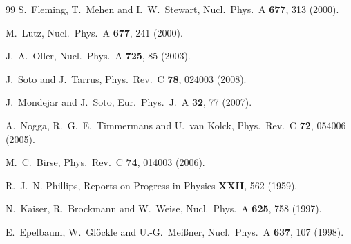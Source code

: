 \documentclass[aps,rmp,nofootinbib,twocolumn,floatfix]{revtex4}
\begin{document}
\begin{thebibliography}{99}
  S.~Fleming, T.~Mehen and I.~W.~Stewart,
  Nucl.\ Phys.\  A {\bf 677}, 313 (2000).

  M.~Lutz,
  Nucl.\ Phys.\  A {\bf 677}, 241 (2000).

  J.~A.~Oller,
  Nucl.\ Phys.\  A {\bf 725}, 85 (2003).

  J.~Soto and J.~Tarrus,
  Phys.\ Rev.\  C {\bf 78}, 024003 (2008).

  J.~Mondejar and J.~Soto,
  Eur.\ Phys.\ J.\  A {\bf 32}, 77 (2007).

  A.~Nogga, R.~G.~E.~Timmermans and U.~van Kolck,
  Phys.\ Rev.\  C {\bf 72}, 054006 (2005).

  M.~C.~Birse,
  Phys.\ Rev.\  C {\bf 74}, 014003 (2006).

R.~J.~N. Phillips,
\newblock Reports on Progress in Physics {\bf XXII}, 562 (1959).


  N.~Kaiser, R.~Brockmann and W.~Weise,
  Nucl.\ Phys.\  A {\bf 625}, 758 (1997).

  E.~Epelbaum, W.~Gl\"ockle and U.-G.~Mei\ss ner,
  Nucl.\ Phys.\  A {\bf 637}, 107 (1998).


\end{thebibliography}
\end{document}

